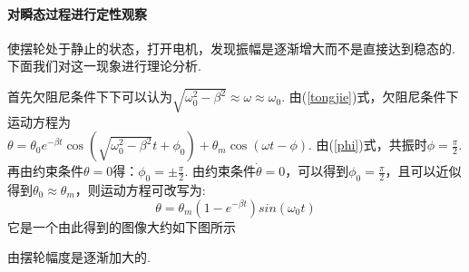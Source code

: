 \documentclass[UTF8]{ctexart}
\begin{document}
\paragraph{对瞬态过程进行定性观察}\quad\par
使摆轮处于静止的状态，打开电机，发现振幅是逐渐增大而不是直接达到稳态的. 下面我们对这一现象进行理论分析.\par
首先欠阻尼条件下下可以认为$\displaystyle{\sqrt{\omega_0^2-\beta^2}\approx\omega\approx\omega_0}$. 由(\ref{tongjie})式，欠阻尼条件下运动方程为\\$\displaystyle{\theta=\theta_0e^{-\beta t}\cos(\sqrt{\omega_0^2-\beta^2}t+\phi_0)+\theta_m\cos(\omega t-\phi)}$. 由(\ref{phi})式，共振时$\phi=\frac{\pi}{2}$. 再由约束条件$\theta=0$得：$\phi_0=\pm \frac{\pi}{2}$. 由约束条件$\dot{\theta}=0$，可以得到$\phi_0=\frac{\pi}{2}$，且可以近似得到$\theta_0\approx \theta_m$，则运动方程可改写为:
\begin{equation}\label{approx}
\theta=\theta_m(1-e^{-\beta t})sin(\omega_0t)
\end{equation}
它是一个由此得到的图像大约如下图所示
\begin{figure}[H]
\end{figure}
由摆轮幅度是逐渐加大的.
\end{document}
